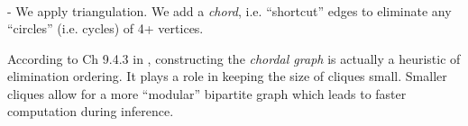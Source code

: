 \begin{frame}\frametitle{\subsubsecname}

	

	\\
	
	\pause 
	
	- We apply triangulation. We add a \emph{chord}, i.e. ``shortcut'' edges to eliminate any ``circles'' (i.e. cycles) of 4+ vertices.
	
	\pause 
	
	According to Ch 9.4.3 in \citep{koller2009probabilistic}, constructing the \emph{chordal graph} is actually a heuristic of elimination ordering. It plays a role in keeping the size of cliques small. Smaller cliques allow for a more ``modular'' bipartite graph which leads to faster computation during inference.
	
\end{frame}

